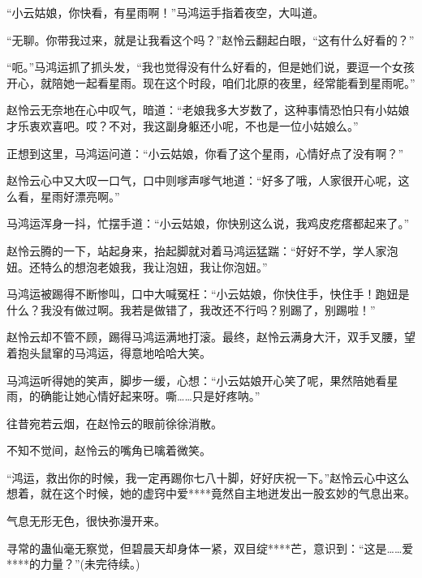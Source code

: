\begin{this_body}
“小云姑娘，你快看，有星雨啊！”马鸿运手指着夜空，大叫道。

“无聊。你带我过来，就是让我看这个吗？”赵怜云翻起白眼，“这有什么好看的？”

“呃。”马鸿运抓了抓头发，“我也觉得没有什么好看的，但是她们说，要逗一个女孩开心，就陪她一起看星雨。现在这个时段，咱们北原的夜里，经常能看到星雨呢。”

赵怜云无奈地在心中叹气，暗道：“老娘我多大岁数了，这种事情恐怕只有小姑娘才乐衷欢喜吧。哎？不对，我这副身躯还小呢，不也是一位小姑娘么。”

正想到这里，马鸿运问道：“小云姑娘，你看了这个星雨，心情好点了没有啊？”

赵怜云心中又大叹一口气，口中则嗲声嗲气地道：“好多了哦，人家很开心呢，这么看，星雨好漂亮啊。”

马鸿运浑身一抖，忙摆手道：“小云姑娘，你快别这么说，我鸡皮疙瘩都起来了。”

赵怜云腾的一下，站起身来，抬起脚就对着马鸿运猛踹：“好好不学，学人家泡妞。还特么的想泡老娘我，我让泡妞，我让你泡妞。”

马鸿运被踢得不断惨叫，口中大喊冤枉：“小云姑娘，你快住手，快住手！跑妞是什么？我没有做过啊。我若是做错了，我改还不行吗？别踢了，别踢啦！”

赵怜云却不管不顾，踢得马鸿运满地打滚。最终，赵怜云满身大汗，双手叉腰，望着抱头鼠窜的马鸿运，得意地哈哈大笑。

马鸿运听得她的笑声，脚步一缓，心想：“小云姑娘开心笑了呢，果然陪她看星雨，的确能让她心情好起来呀。嘶……只是好疼呐。”

往昔宛若云烟，在赵怜云的眼前徐徐消散。

不知不觉间，赵怜云的嘴角已噙着微笑。

“鸿运，救出你的时候，我一定再踢你七八十脚，好好庆祝一下。”赵怜云心中这么想着，就在这个时候，她的虚窍中爱****竟然自主地迸发出一股玄妙的气息出来。

气息无形无色，很快弥漫开来。

寻常的蛊仙毫无察觉，但碧晨天却身体一紧，双目绽****芒，意识到：“这是……爱****的力量？”(未完待续。)

\end{this_body}

